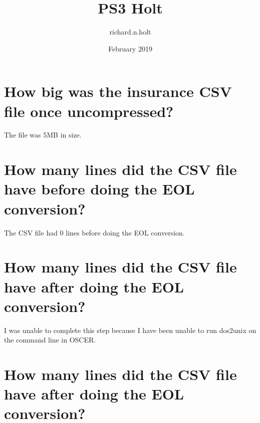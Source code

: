 \documentclass{article}
\title{PS3 Holt}
\author{richard.n.holt }
\date{February 2019}
\begin{document}
\maketitle

\section{How big was the insurance CSV file once uncompressed?}
The file was 5MB in size.

\section{How many lines did the CSV file have before doing the EOL conversion?}
The CSV file had 0 lines before doing the EOL conversion.

\section{How many lines did the CSV file have after doing the EOL conversion?}
I was unable to complete this step because I have been unable to run dos2unix on the command line in OSCER.

\section{How many lines did the CSV file have after doing the EOL conversion?}
\end{document}
